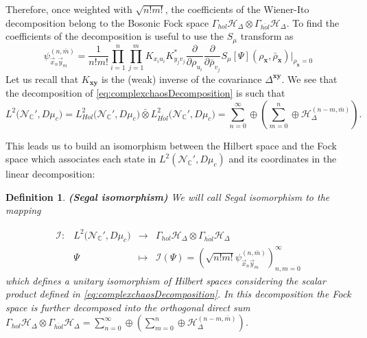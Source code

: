 \documentclass[12pt]{article}%
\newtheorem{definition}{Definition}%
\begin{document}
    Therefore, once weighted with $\sqrt{n!m!}$, the coefficients  of the Wiener-Ito decomposition belong to the Bosonic Fock space $\Gamma_{hol}\mathcal{H}_\Delta\otimes \Gamma_{\overline{hol}}\mathcal{H}_\Delta$.  To find the coefficients of the decomposition is useful to use the $S_{\mu}$ transform as
    \begin{equation}
    \label{eq:wienerItoSeagalwithTtransform}
    \psi^{(n,\bar{m})}_{\vec{x}_n\vec{y}_m}=\frac{1}{n!m!}\prod_{i=1}^n\prod_{j=1}^m K_{x_iu_i}K^*_{y_jv_j}\frac{\partial}{\partial \rho_{u_i}}\frac{\partial}{\partial \bar\rho_{v_j}}  {S_\mu[\Psi](\rho_\mathbf{x},\bar{\rho}_\mathbf{x})} \bigg\lvert_{\rho_\mathbf{x}=0}
    \end{equation}
    Let us recall that $K_{\mathbf{xy}}$ is the  (weak) inverse of the covariance $\Delta^{\mathbf{xy}}$.
     We see that the decomposition of \eqref{eq:complexchaosDecomposition} is such that
     \begin{equation}
        \label{eq:holantiholdec}
        L^2\big({\mathcal{N}_{\mathbb{C}}'}, D\mu_c\big)=L^2_{Hol}\big({\mathcal{N}_{\mathbb{C}}'}, D\mu_c\big)\bar{\otimes} L^2_{\overline{Hol}}\big({\mathcal{N}_{\mathbb{C}}'}, D\mu_c\big)=\sum_{n=0}^\infty\oplus \left( \sum_{m=0}^n\oplus \mathcal{H}_\Delta^{(n-m,\bar{m})} \right).
    \end{equation}

    This leads us to build an isomorphism between the Hilbert space and the Fock space which associates each state in $L^2({\mathcal{N}_{\mathbb{C}}'}, D\mu_c)$ and its coordinates in the linear decomposition:

\begin{definition}
    \label{def:SegalIso}{\bf (Segal isomorphism)} 
    We will call Segal isomorphism to the mapping


    \begin{equation}
\label{eq:Segal}
\begin{array}{cccc}
    \mathcal{I} :&  L^2\big({\mathcal{N}_{\mathbb{C}}'}, D\mu_c\big) & \longrightarrow &  \Gamma_{hol}\mathcal{H}_\Delta\otimes \Gamma_{\overline{hol}}\mathcal{H}_\Delta
 \\ 
 &  \Psi &\longmapsto &  \mathcal{I}(\Psi)=\left (\sqrt{n!m!}\psi^{(n,\bar{m})}_{\vec x_n \vec y_m} \right )_{n,m=0}^\infty 
\end{array}
\end{equation}
which defines a unitary isomorphism of Hilbert spaces considering the scalar product defined in \eqref{eq:complexchaosDecomposition}. In this decomposition the Fock space is further decomposed into the orthogonal direct sum $\Gamma_{hol}\mathcal{H}_\Delta\otimes \Gamma_{\overline{hol}}\mathcal{H}_\Delta
=\sum_{n=0}^\infty\oplus \left( \sum_{m=0}^n\oplus \mathcal{H}_\Delta^{(n-m,\bar{m})} \right)$.
\end{definition} 
\end{document}
